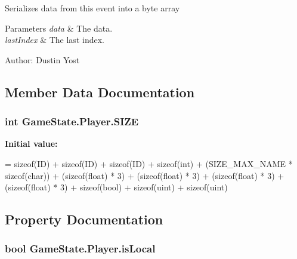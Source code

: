 Serializes data from this event into a byte array 


\begin{DoxyParams}{Parameters}
{\em data} & The data.\\
\hline
{\em last\-Index} & The last index.\\
\hline
\end{DoxyParams}


Author\-: Dustin Yost 

\subsection{Member Data Documentation}
\hypertarget{struct_game_state_1_1_player_ada2d068d3d5f973f73abac805c162d17}{
\subsubsection[{S\-I\-Z\-E}]{\setlength{\rightskip}{0pt plus 5cm}int Game\-State.\-Player.\-S\-I\-Z\-E\hspace{0.3cm}{\ttfamily [static]}}}\label{struct_game_state_1_1_player_ada2d068d3d5f973f73abac805c162d17}
{\bfseries Initial value\-:}
\begin{DoxyCode}
=
            \textcolor{keyword}{sizeof}(ID) 
            + \textcolor{keyword}{sizeof}(ID) 
            + \textcolor{keyword}{sizeof}(ID) 
            + \textcolor{keyword}{sizeof}(\textcolor{keywordtype}{int}) + (SIZE\_MAX\_NAME * \textcolor{keyword}{sizeof}(char))
            + (\textcolor{keyword}{sizeof}(float) * 3) 
            + (\textcolor{keyword}{sizeof}(float) * 3) 
            + (\textcolor{keyword}{sizeof}(float) * 3) 
            + (\textcolor{keyword}{sizeof}(float) * 3) 
            + \textcolor{keyword}{sizeof}(bool) 
            + \textcolor{keyword}{sizeof}(uint) 
            + \textcolor{keyword}{sizeof}(uint)
\end{DoxyCode}


\subsection{Property Documentation}
\hypertarget{struct_game_state_1_1_player_affd7c601a6d763dafdc59a58c415e9e7}{
\subsubsection[{is\-Local}]{\setlength{\rightskip}{0pt plus 5cm}bool Game\-State.\-Player.\-is\-Local\hspace{0.3cm}{\ttfamily [get]}}}\label{struct_game_state_1_1_player_affd7c601a6d763dafdc59a58c415e9e7}


